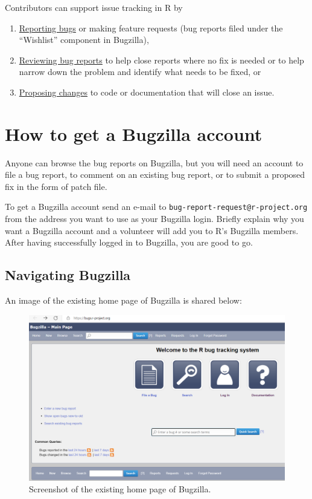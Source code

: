\documentclass[
]{book}
\begin{document}
Contributors can support issue tracking in R by

\begin{enumerate}
\def\labelenumi{\arabic{enumi}.}
\item
  \href{https://contributor.r-project.org/rdevguide/ReportBugs.html}{Reporting bugs} or making feature requests (bug reports filed under the ``Wishlist'' component in Bugzilla),
\item
  \href{https://contributor.r-project.org/rdevguide/ReviewBugs.html}{Reviewing bug reports} to help close reports where no fix is needed or to help narrow down the problem and identify what needs to be fixed, or
\item
  \href{https://contributor.r-project.org/rdevguide/FixBug.html\#FixBug}{Proposing changes} to code or documentation that will close an issue.
\end{enumerate}

\hypertarget{bugzilla-account}{%
\section{How to get a Bugzilla account}\label{bugzilla-account}}

Anyone can browse the bug reports on Bugzilla, but you will need an account to file a bug report, to comment on an existing bug report, or to submit a proposed fix in the form of patch file.

To get a Bugzilla account send an e-mail to \texttt{bug-report-request@r-project.org} from the address you want to use as your Bugzilla login. Briefly explain why you want a Bugzilla account and a volunteer will add you to R's Bugzilla members. After having successfully logged in to Bugzilla, you are good to go.

\hypertarget{Bugzilla}{%
\subsection{Navigating Bugzilla}\label{Bugzilla}}

An image of the existing home page of Bugzilla is shared below:

\begin{figure}
\centering
\includegraphics{img/bugzilla.png}
\caption{Screenshot of the existing home page of Bugzilla.}
\end{figure}
\end{document}
